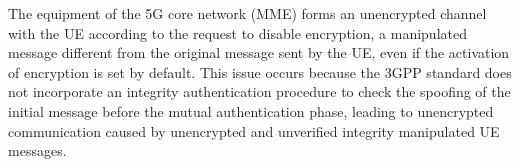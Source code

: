 \documentclass[english]{article}
\begin{document}

The equipment of the 5G core network (MME) forms an unencrypted channel with
the UE according to the request to disable encryption, a manipulated message
different from the original message sent by the UE, even if the activation of
encryption is set by default. This issue occurs because the 3GPP standard does
not incorporate an integrity authentication procedure to check the spoofing of
the initial message before the mutual authentication phase, leading to
unencrypted communication caused by unencrypted and unverified integrity
manipulated UE messages.
\end{document}
